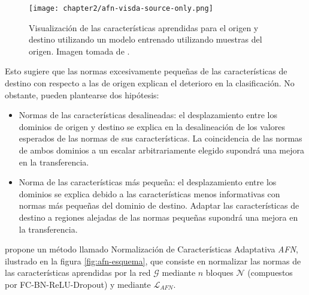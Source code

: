 \begin{figure}[H]
  \centering
  \texttt{[image: chapter2/afn-visda-source-only.png]}

  \caption[Representación de características aprendidas de una CNN]{Visualización de las características aprendidas para el origen y destino utilizando un modelo entrenado utilizando muestras del origen. Imagen tomada de \cite{xu2019larger}.}
  \label{fig:afn-source-only}
\end{figure}

Esto sugiere que las normas excesivamente pequeñas de las características de destino con respecto a las de origen
explican el deterioro en la clasificación. No obstante, pueden plantearse dos hipótesis:

\begin{itemize}
  \item Normas de las características desalineadas: el desplazamiento entre los dominios de origen y destino se explica en la
        desalineación de los valores esperados de las normas de sus características. La coincidencia de las normas de ambos
        dominios a un escalar arbitrariamente elegido supondrá una mejora en la transferencia.
  \item Norma de las características más pequeña: el desplazamiento entre los dominios se explica debido a las características
        menos informativas con normas más pequeñas del dominio de destino. Adaptar las características de destino a regiones
        alejadas de las normas pequeñas supondrá una mejora en la transferencia.
\end{itemize}

\cite{xu2019larger} propone un método llamado Normalización de Características Adaptativa {\it AFN}, ilustrado en la figura \ref{fig:afn-esquema}, que consiste en normalizar las normas de las características aprendidas por la red $\mathcal{G}$ mediante $n$ bloques $\mathcal{N}$ (compuestos por FC-BN-ReLU-Dropout) y mediante $\mathcal{L}_{AFN}$.

